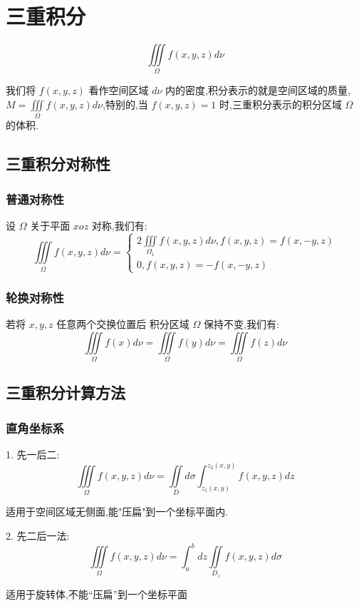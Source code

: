\chapter{三重积分}
\begin{definition}[三重积分]
	$$\iiint\limits_{\Omega}f(x,y,z)d\nu$$
	
	我们将 $f(x,y,z)$ 看作空间区域 $d\nu$ 内的密度,积分表示的就是空间区域的质量,$M=\iiint\limits_{\Omega}f(x,y,z)d\nu$,特别的,当 $f(x,y,z)=1$ 时,三重积分表示的积分区域 $\Omega$ 的体积.
\end{definition}
\section{三重积分对称性}

\subsection{普通对称性}

\begin{definition}
	设 $\Omega$ 关于平面 $xoz$ 对称,我们有: 
	$$\iiint\limits_{\Omega}f(x,y,z)d\nu=\left\lbrace \begin{array}{l}
		2\iiint\limits_{\Omega_{1}}f(x,y,z)d\nu,f(x,y,z)=f(x,-y,z)\\
		0,f(x,y,z)=-f(x,-y,z)
	\end{array}\right. $$
\end{definition}
\subsection{轮换对称性}
\begin{definition}
	若将 $x,y,z$ 任意两个交换位置后 积分区域 $\Omega$ 保持不变,我们有: 
	$$\iiint\limits_{\Omega}f(x)d\nu=\iiint\limits_{\Omega}f(y)d\nu=\iiint\limits_{\Omega}f(z)d\nu$$
\end{definition}

\section{三重积分计算方法}

\subsection{直角坐标系}
\begin{definition}
	1. 先一后二: 
	$$\iiint\limits_{\Omega}f(x,y,z)d\nu=\iint\limits_{D}d\sigma \int_{z_{1}(x,y)}^{z_{2}(x,y)}f(x,y,z)dz$$
	
	适用于空间区域无侧面,能"压扁"到一个坐标平面内.
	
	2. 先二后一法: 
	$$\iiint\limits_{\Omega}f(x,y,z)d\nu=\int_{a}^{b}dz\iint\limits_{D_{z}}f(x,y,z)d\sigma$$
	
	适用于旋转体,不能“压扁”到一个坐标平面
\end{definition}

